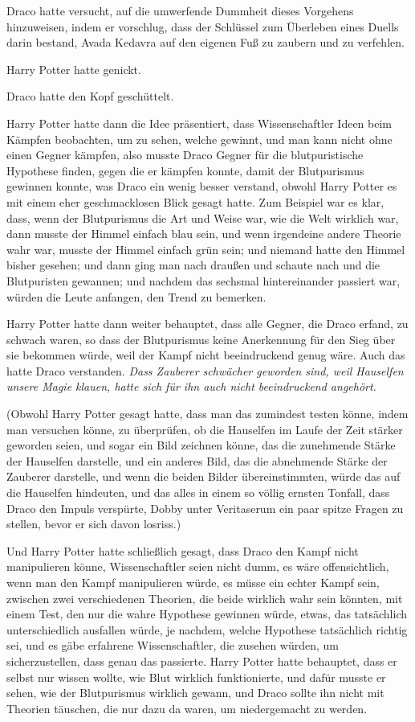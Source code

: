 Draco hatte versucht, auf die umwerfende Dummheit dieses Vorgehens hinzuweisen,
indem er vorschlug, dass der Schlüssel zum Überleben eines Duells darin bestand,
Avada Kedavra auf den eigenen Fuß zu zaubern und zu verfehlen.

Harry Potter hatte genickt.

Draco hatte den Kopf geschüttelt.

Harry Potter hatte dann die Idee präsentiert, dass Wissenschaftler Ideen beim
Kämpfen beobachten, um zu sehen, welche gewinnt, und man kann nicht ohne einen
Gegner kämpfen, also musste Draco Gegner für die blutpuristische Hypothese
finden, gegen die er kämpfen konnte, damit der Blutpurismus gewinnen konnte, was
Draco ein wenig besser verstand, obwohl Harry Potter es mit einem eher
geschmacklosen Blick gesagt hatte. Zum Beispiel war es klar, dass, wenn der
Blutpurismus die Art und Weise war, wie die Welt wirklich war, dann musste der
Himmel einfach blau sein, und wenn irgendeine andere Theorie wahr war, musste
der Himmel einfach grün sein; und niemand hatte den Himmel bisher gesehen; und
dann ging man nach draußen und schaute nach und die Blutpuristen gewannen; und
nachdem das sechsmal hintereinander passiert war, würden die Leute anfangen, den
Trend zu bemerken.

Harry Potter hatte dann weiter behauptet, dass alle Gegner, die Draco erfand, zu
schwach waren, so dass der Blutpurismus keine Anerkennung für den Sieg über sie
bekommen würde, weil der Kampf nicht beeindruckend genug wäre. Auch das hatte
Draco verstanden. \emph{Dass Zauberer schwächer geworden sind, weil Hauselfen
unsere Magie klauen, hatte sich für ihn auch nicht beeindruckend angehört.}

(Obwohl Harry Potter gesagt hatte, dass man das zumindest testen könne, indem
man versuchen könne, zu überprüfen, ob die Hauselfen im Laufe der Zeit stärker
geworden seien, und sogar ein Bild zeichnen könne, das die zunehmende Stärke der
Hauselfen darstelle, und ein anderes Bild, das die abnehmende Stärke der
Zauberer darstelle, und wenn die beiden Bilder übereinstimmten, würde das auf
die Hauselfen hindeuten, und das alles in einem so völlig ernsten Tonfall, dass
Draco den Impuls verspürte, Dobby unter Veritaserum ein paar spitze Fragen zu
stellen, bevor er sich davon losriss.)

Und Harry Potter hatte schließlich gesagt, dass Draco den Kampf nicht
manipulieren könne, Wissenschaftler seien nicht dumm, es wäre offensichtlich,
wenn man den Kampf manipulieren würde, es müsse ein echter Kampf sein, zwischen
zwei verschiedenen Theorien, die beide wirklich wahr sein könnten, mit einem
Test, den nur die wahre Hypothese gewinnen würde, etwas, das tatsächlich
unterschiedlich ausfallen würde, je nachdem, welche Hypothese tatsächlich
richtig sei, und es gäbe erfahrene Wissenschaftler, die zusehen würden, um
sicherzustellen, dass genau das passierte. Harry Potter hatte behauptet, dass er
selbst nur wissen wollte, wie Blut wirklich funktionierte, und dafür musste er
sehen, wie der Blutpurismus wirklich gewann, und Draco sollte ihn nicht mit
Theorien täuschen, die nur dazu da waren, um niedergemacht zu werden.

